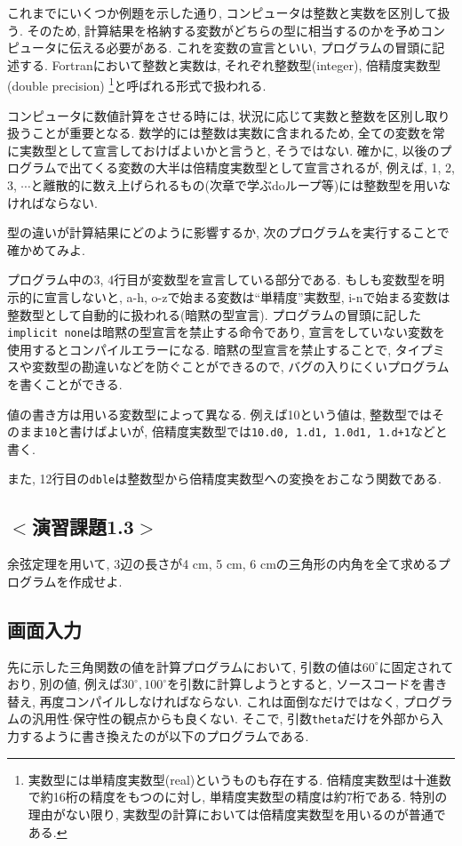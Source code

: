 これまでにいくつか例題を示した通り, コンピュータは整数と実数を区別して扱う.
そのため, 計算結果を格納する変数がどちらの型に相当するのかを予めコンピュータに伝える必要がある.
これを変数の宣言といい, プログラムの冒頭に記述する.
Fortranにおいて整数と実数は, それぞれ整数型(integer), 倍精度実数型(double precision)
\footnote{実数型には単精度実数型(real)というものも存在する.
倍精度実数型は十進数で約16桁の精度をもつのに対し,
単精度実数型の精度は約7桁である.
特別の理由がない限り, 実数型の計算においては倍精度実数型を用いるのが普通である.
}と呼ばれる形式で扱われる.

コンピュータに数値計算をさせる時には, 状況に応じて実数と整数を区別し取り扱うことが重要となる.
数学的には整数は実数に含まれるため, 全ての変数を常に実数型として宣言しておけばよいかと言うと, そうではない.
確かに, 以後のプログラムで出てくる変数の大半は倍精度実数型として宣言されるが,
例えば, 1, 2, 3, $\cdots$と離散的に数え上げられるもの(次章で学ぶdoループ等)には整数型を用いなければならない.

型の違いが計算結果にどのように影響するか, 次のプログラムを実行することで確かめてみよ.

プログラム中の3, 4行目が変数型を宣言している部分である.
もしも変数型を明示的に宣言しないと, a-h, o-zで始まる変数は``単精度''実数型,
i-nで始まる変数は整数型として自動的に扱われる(暗黙の型宣言).
プログラムの冒頭に記した\verb|implicit none|は暗黙の型宣言を禁止する命令であり,
宣言をしていない変数を使用するとコンパイルエラーになる.
暗黙の型宣言を禁止することで, タイプミスや変数型の勘違いなどを防ぐことができるので,
バグの入りにくいプログラムを書くことができる.

値の書き方は用いる変数型によって異なる.
例えば10という値は, 整数型ではそのまま\verb|10|と書けばよいが,
倍精度実数型では\verb|10.d0, 1.d1, 1.0d1, 1.d+1|などと書く.

また, 12行目の\verb|dble|は整数型から倍精度実数型への変換をおこなう関数である. \\


\subsection*{$<$演習課題1.3$>$}
余弦定理を用いて, 3辺の長さが4 cm, 5 cm, 6 cmの三角形の内角を全て求めるプログラムを作成せよ.

\subsection*{画面入力}
先に示した三角関数の値を計算プログラムにおいて, 引数の値は$60^\circ$に固定されており,
別の値, 例えば$30^\circ, 100^\circ$を引数に計算しようとすると, ソースコードを書き替え,
再度コンパイルしなければならない.
これは面倒なだけではなく, プログラムの汎用性$\cdot$保守性の観点からも良くない.
そこで, 引数\verb|theta|だけを外部から入力するように書き換えたのが以下のプログラムである.


